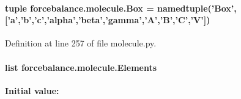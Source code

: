 \hypertarget{namespaceforcebalance_1_1molecule_aa761cf1cf260e15d0b03a6f61569c840}{
\paragraph[{Box}]{\setlength{\rightskip}{0pt plus 5cm}tuple forcebalance.\-molecule.\-Box = namedtuple('Box',\mbox{[}'a','b','c','alpha','beta','gamma','A','B','C','V'\mbox{]})}}\label{namespaceforcebalance_1_1molecule_aa761cf1cf260e15d0b03a6f61569c840}


Definition at line 257 of file molecule.\-py.

\hypertarget{namespaceforcebalance_1_1molecule_a1c99a11e8a749468698c9af6361a8a4c}{
\paragraph[{Elements}]{\setlength{\rightskip}{0pt plus 5cm}list forcebalance.\-molecule.\-Elements}}\label{namespaceforcebalance_1_1molecule_a1c99a11e8a749468698c9af6361a8a4c}
{\bfseries Initial value\-:}
